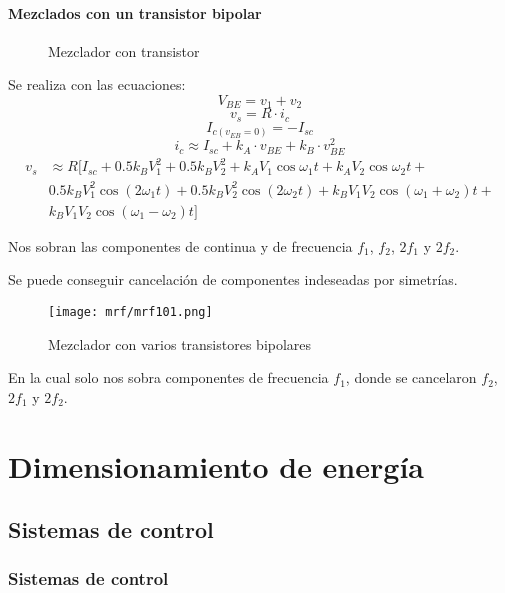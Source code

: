\documentclass[
	12pt, %
	fleqn, %
	a4paper, %
	oneside, %
]{LegrandOrangeBook}
\begin{document}
\subsection{Mezclados con un transistor bipolar}
\begin{figure}[H]
\centering
{}
\caption{Mezclador con transistor}
\end{figure}
Se realiza con las ecuaciones:
\begin{equation}
V_{BE}=v_1+v_2
\end{equation}
\begin{equation}
v_s=R\cdot i_c
\end{equation}
\begin{equation}
I_{c(v_{EB}=0)}=-I_{sc}
\end{equation}
\begin{equation}
i_c\approx I_{sc}+k_A\cdot v_{BE}+k_B\cdot v_{BE}^2
\end{equation}
\begin{align}
v_s&\approx R[I_{sc}+0.5k_BV_1^2+0.5k_BV_2^2+k_AV_1\cos\omega_1t+k_AV_2\cos\omega_2t+\\
&0.5k_BV_1^2\cos(2\omega_1t)+0.5k_BV_2^2\cos(2\omega_2t)+k_BV_1V_2\cos(\omega_1+\omega_2)t+\\
&k_BV_1V_2\cos(\omega_1-\omega_2)t]
\end{align}
\begin{notation}
Nos sobran las componentes de continua y de frecuencia $f_1$, $f_2$, $2f_1$ y $2f_2$.
\end{notation}
Se puede conseguir cancelación de componentes indeseadas por simetrías.
\begin{figure}[H]
\centering
\texttt{[image: mrf/mrf101.png]}
\caption{Mezclador con varios transistores bipolares}
\end{figure}
En la cual solo nos sobra componentes de frecuencia $f_1$, donde se cancelaron $f_2$, $2f_1$ y $2f_2$.
\part{Dimensionamiento de energía}
\chapter{Sistemas de control}
\section{Sistemas de control}
\end{document}

